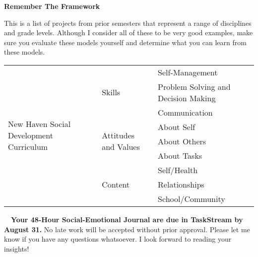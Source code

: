 \documentclass[10pt]{article}
\newcommand{\dueDate}[1]{\textbf{\textcolor{fsuMaroon}{#1}}}
\newcommand{\subHead}[1]{\noindent\textbf{\textsf{\textcolor{fsuMaroon}{#1}}}}
\newcommand{\dueCalendar}{\noindent\lettrine{\dueDate{\faCalendar}}{~~}}
\newcommand{\dueText}[1]{\normalsize\textsf{#1}}
\begin{document}
\subHead{Remember The Framework}

This is a list of projects from prior semesters that represent a range of disciplines and grade levels. Although I consider all of these to be very good examples, make sure you evaluate these models yourself and determine what you can learn from these models.

\footnotesize\centering\begin{tabular}{p{2in}p{2in}p{2in}}
	\toprule
	\multirow{9}{*}{\parbox[l]{5cm}{\raggedright\Large New Haven Social Development Curriculum \footnotesize}} & \multirow{3}{*}{\normalsize Skills \footnotesize} & Self-Management \\
	 & & Problem Solving and Decision Making \\
	 & & Communication \\
	\cline{2-3}
	 & \multirow{3}{*}{\normalsize Attitudes and Values \footnotesize} & About Self \\
	 & & About Others \\
	 & & About Tasks \\
	 \cline{2-3}
	 & \multirow{3}{*}{\normalsize Content \footnotesize} & Self/Health \\
	 & & Relationships \\
	 & & School/Community \\
	 \bottomrule
\end{tabular}\justifying

\vfill

\dueCalendar\dueText{\dueDate{Your 48-Hour Social-Emotional Journal are due in TaskStream by August 31.} No late work will be accepted without prior approval. Please let me know if you have any questions whatsoever. I look forward to reading your insights!}
\newpage

\centering
\end{document}
